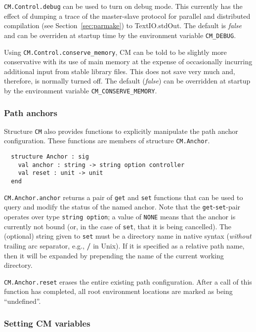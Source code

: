 \documentclass[titlepage,letterpaper]{article}
\begin{document}
{\tt CM.Control.debug} can be used to turn on debug mode.  This
currently has the effect of dumping a trace of the master-slave
protocol for parallel and distributed compilation (see
Section~\ref{sec:parmake}) to TextIO.stdOut. The default is {\em
false} and can be overriden at startup time by the environment
variable {\tt CM\_DEBUG}.

Using {\tt CM.Control.conserve\_memory}, CM can be told to be slightly
more conservative with its use of main memory at the expense of
occasionally incurring additional input from stable library files.
This does not save very much and, therefore, is normally turned off.
The default ({\em false}) can be overridden at startup by the
environment variable {\tt CM\_CONSERVE\_MEMORY}.

\subsubsection*{Path anchors}

Structure {\tt CM} also provides functions to explicitly manipulate
the path anchor configuration.  These functions are members of
structure {\tt CM.Anchor}.

\begin{verbatim}
  structure Anchor : sig
    val anchor : string -> string option controller
    val reset : unit -> unit
  end
\end{verbatim}

{\tt CM.Anchor.anchor} returns a pair of {\tt get} and {\tt set}
functions that can be used to query and modify the status of the named
anchor.  Note that the {\tt get}-{\tt set}-pair operates over type
{\tt string option}; a value of {\tt NONE} means that the anchor is
currently not bound (or, in the case of {\tt set}, that it is being
cancelled).  The (optional) string given to {\tt set} must be a
directory name in native syntax ({\em without} trailing arc separator,
e.g., {\bf /} in Unix).  If it is specified as a relative path name,
then it will be expanded by prepending the name of the current working
directory.

{\tt CM.Anchor.reset} erases the entire existing path configuration.
After a call of this function has completed, all root environment
locations are marked as being ``undefined''.

\subsubsection*{Setting CM variables}
\end{document}
